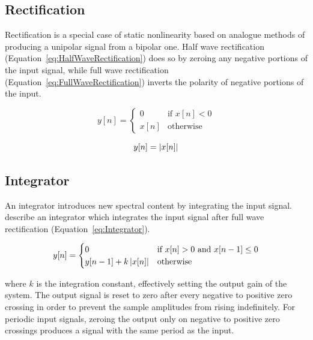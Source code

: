 	\subsection{Rectification}
	\label{sec:Excitation-Methods-Rectification}
		Rectification is a special case of static nonlinearity based on analogue methods of producing a unipolar
		signal from a bipolar one. Half wave rectification (Equation~\ref{eq:HalfWaveRectification}) does so by
		zeroing any negative portions of the input signal, while full wave rectification
		(Equation~\ref{eq:FullWaveRectification}) inverts the polarity of negative portions of the input.

		\begin{equation}
			y[n] = \begin{cases}
				0 & \text{if $x[n] < 0$} \\
				x[n] & \text{otherwise}
			\end{cases}
			\label{eq:HalfWaveRectification}
		\end{equation}

		\begin{equation}
			y[n] = \left|x[n]\right|
			\label{eq:FullWaveRectification}
		\end{equation}

	\subsection{Integrator}
	\label{sec:Excitation-Methods-Integrator}
		An integrator introduces new spectral content by integrating the input signal. \citet{larsen2004audio}
		describe an integrator which integrates the input signal after full wave rectification
		(Equation~\ref{eq:Integrator}).

		\begin{equation}
			y[n] = \begin{cases}
				0 & \text{if $x[n] > 0$ and $x[n - 1] \leq 0$} \\
				y[n - 1] + k\left|x[n]\right| & \text{otherwise}
			\end{cases}
			\label{eq:Integrator}
		\end{equation}

		where $k$ is the integration constant, effectively setting the output gain of the system. The output signal
		is reset to zero after every negative to positive zero crossing in order to prevent the sample amplitudes
		from rising indefinitely. For periodic input signals, zeroing the output only on negative to positive zero
		crossings produces a signal with the same period as the input.

